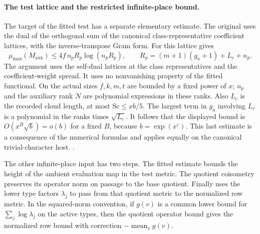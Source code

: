 \paragraph{The test lattice and the restricted infinite-place bound.}
The target of the fitted test has a separate elementary estimate.
The original  uses the dual of the orthogonal
sum of the canonical class-representative coefficient lattices,
with the inverse-transpose Gram form. For this lattice
 gives
\[
 \mu_{\max}(M_{\mathrm{aux}})
     \le 4f\,n_pR_p\log(n_pR_p),\qquad
 R_p=(m+1)(g_a+1)+L_c+n_p .
\]
The argument uses the self-dual lattices at the class
representatives and the coefficient-weight spread. It uses no
nonvanishing property of the fitted functional. On the actual
sizes \(f,k,m,t\) are bounded by a fixed power of \(x\);
\(n_p\) and the auxiliary rank \(N\) are polynomial expressions
in these ranks. Also \(L_c\) is the recorded cloud length, at
most \(\mathrm{Sc}\le xb/5\). The largest term in \(g_a\) involving
\(L_c\) is a polynomial in the ranks times \(\sqrt{L_c}\).
It follows that the displayed bound is
\(O(x^B\sqrt b)=o(b)\) for a fixed \(B\), because
\(b=\exp(x^\varepsilon)\). This last estimate is a consequence
of the numerical formulas and applies equally on the canonical
trivial-character host.
.

The other infinite-place input has two steps. The fitted
 estimate bounds the height of the ambient evaluation
map in the test metric. The quotient coisometry preserves its
operator norm on passage to the base quotient. Finally
 uses the lower type factors \(\lambda_j\) to
pass from that quotient metric to the normalized row metric.
In the squared-norm convention, if \(g(v)\) is a common lower
bound for \(\sum_j\log\lambda_j\) on the active types, then the
quotient operator bound gives the normalized row bound with
correction \(-\operatorname{mean}_v g(v)\).


